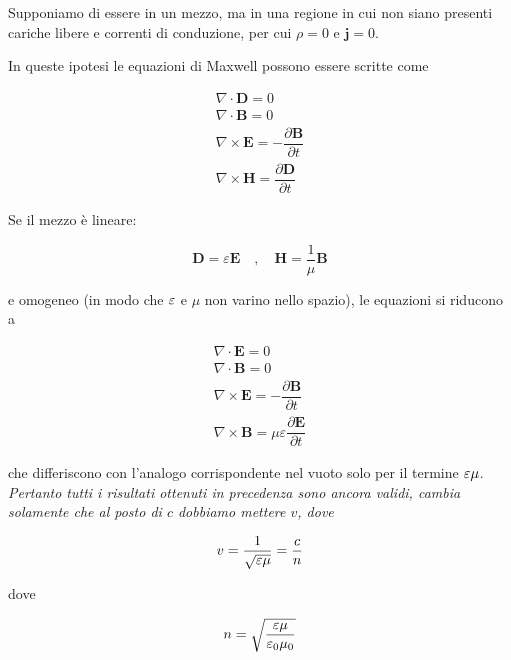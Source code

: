 Supponiamo di essere in un mezzo, ma in una regione in cui non siano presenti cariche libere e correnti di conduzione, per cui $\rho = 0$ e $\mathbf{j} = 0$. 

In queste ipotesi le equazioni di Maxwell possono essere scritte come 

\begin{align*}
    \nabla \cdot \mathbf{D} = 0 \\
    \nabla \cdot \mathbf{B} = 0 \\
    \nabla \times \mathbf{E} = -\dfrac{\partial \mathbf{B}}{\partial t} \\
    \nabla \times \mathbf{H} = \dfrac{\partial \mathbf{D}}{\partial t}
\end{align*}

Se il mezzo è lineare:

\begin{equation}
    \mathbf{D} = \varepsilon \mathbf{E} \quad , \quad \mathbf{H} = \frac{1}{\mu} \mathbf{B}
\end{equation}

e omogeneo (in modo che $\varepsilon$ e $\mu$ non varino nello spazio), le equazioni si riducono a 

\begin{align*}
    \nabla \cdot \mathbf{E} = 0 \\
    \nabla \cdot \mathbf{B} = 0 \\
    \nabla \times \mathbf{E} = -\dfrac{\partial \mathbf{B}}{\partial t} \\
    \nabla \times \mathbf{B} = \mu \varepsilon \dfrac{\partial \mathbf{E}}{\partial t}
\end{align*}

che differiscono con l'analogo corrispondente nel vuoto solo per il termine $\varepsilon \mu$. \\

\emph{Pertanto tutti i risultati ottenuti in precedenza sono ancora validi, cambia solamente che al posto di $c$ dobbiamo mettere $v$, dove}

\begin{tcolorbox}[colback=yellow!10!white, colframe=orange!70!black, boxrule=0.8pt]
\begin{equation}
    v = \frac{1}{\sqrt{\varepsilon \mu}} = \frac{c}{n} 
\end{equation}
\end{tcolorbox}

dove 

\begin{tcolorbox}[colback=yellow!10!white, colframe=orange!70!black, boxrule=0.8pt]
\begin{equation}
    n = \sqrt{\frac{\varepsilon \mu}{\varepsilon_0 \mu_0}}
\end{equation}
\end{tcolorbox}

